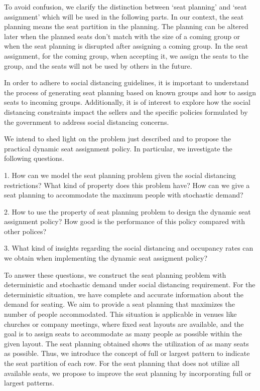 To avoid confusion, we clarify the distinction between `seat planning' and `seat assignment' which will be used in the following parts. In our context, the seat planning means the seat partition in the planning. The planning can be altered later when the planned seats don't match with the size of a coming group or when the seat planning is disrupted after assigning a coming group. In the seat assignment, for the coming group, when accepting it, we assign the seats to the group, and the seats will not be used by others in the future.

In order to adhere to social distancing guidelines, it is important to understand the process of generating seat planning based on known groups and how to assign seats to incoming groups. Additionally, it is of interest to explore how the social distancing constraints impact the sellers and the specific policies formulated by the government to address social distancing concerns.

We intend to shed light on the problem just described and to propose the practical dynamic seat assignment policy. In particular, we investigate the following questions. 

1. How can we model the seat planning problem given the social distancing restrictions? What kind of property does this problem have? How can we give a seat planning to accommodate the maximum people with stochastic demand?

2. How to use the property of seat planning problem to design the dynamic seat assignment policy? How good is the performance of this policy compared with other polices?

3. What kind of insights regarding the social distancing and occupancy rates can we obtain when implementing the dynamic seat assigment policy?


To answer these questions, we construct the seat planning problem with deterministic and stochastic demand under social distancing requirement. For the deterministic situation, we have complete and accurate information about the demand for seating. We aim to provide a seat planning that maximizes the number of people accommodated. This situation is applicable in venues like churches or company meetings, where fixed seat layouts are available, and the goal is to assign seats to accommodate as many people as possible within the given layout. The seat planning obtained shows the utilization of as many seats as possible. Thus, we introduce the concept of full or largest pattern to indicate the seat partition of each row. For the seat planning that does not utilize all available seats, we propose to improve the seat planning by incorporating full or largest patterns.

